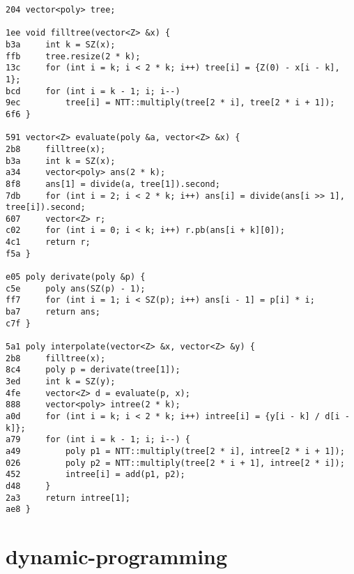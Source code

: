 \documentclass[11pt, a4paper, twoside]{article}
\begin{document}
\begin{lstlisting}
204 vector<poly> tree;

1ee void filltree(vector<Z> &x) {
b3a     int k = SZ(x);
ffb     tree.resize(2 * k);
13c     for (int i = k; i < 2 * k; i++) tree[i] = {Z(0) - x[i - k], 1};
bcd     for (int i = k - 1; i; i--)
9ec         tree[i] = NTT::multiply(tree[2 * i], tree[2 * i + 1]);
6f6 }

591 vector<Z> evaluate(poly &a, vector<Z> &x) {
2b8     filltree(x);
b3a     int k = SZ(x);
a34     vector<poly> ans(2 * k);
8f8     ans[1] = divide(a, tree[1]).second;
7db     for (int i = 2; i < 2 * k; i++) ans[i] = divide(ans[i >> 1], tree[i]).second;
607     vector<Z> r;
c02     for (int i = 0; i < k; i++) r.pb(ans[i + k][0]);
4c1     return r;
f5a }

e05 poly derivate(poly &p) {
c5e     poly ans(SZ(p) - 1);
ff7     for (int i = 1; i < SZ(p); i++) ans[i - 1] = p[i] * i;
ba7     return ans;
c7f }

5a1 poly interpolate(vector<Z> &x, vector<Z> &y) {
2b8     filltree(x);
8c4     poly p = derivate(tree[1]);
3ed     int k = SZ(y);
4fe     vector<Z> d = evaluate(p, x);
888     vector<poly> intree(2 * k);
a0d     for (int i = k; i < 2 * k; i++) intree[i] = {y[i - k] / d[i - k]};
a79     for (int i = k - 1; i; i--) {
a49         poly p1 = NTT::multiply(tree[2 * i], intree[2 * i + 1]);
026         poly p2 = NTT::multiply(tree[2 * i + 1], intree[2 * i]);
452         intree[i] = add(p1, p2);
d48     }
2a3     return intree[1];
ae8 }
\end{lstlisting}



%
%

\section{dynamic-programming}
\end{document}
